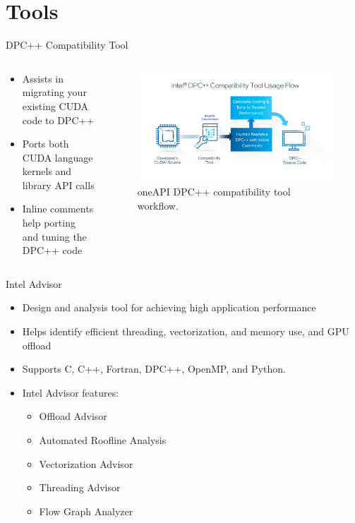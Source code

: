 \documentclass[aspectratio=169]{beamer}
\begin{document}
\section{Tools}

\begin{frame}{DPC++ Compatibility Tool}
\begin{columns}
\begin{column}{0.5\textwidth}
\begin{itemize}
  \item Assists in migrating your existing CUDA code to DPC++
  \item Ports both CUDA language kernels and library API calls
  \item Inline comments help porting and tuning the DPC++ code
\end{itemize}
\end{column}
\begin{column}{0.5\textwidth}
\begin{figure}
  \includegraphics[width=\linewidth]{figures/diagram-oneapi-dpc-compat-tool-16x9.png}
  \caption{oneAPI DPC++ compatibility tool workflow.}
\end{figure}
\end{column}
\end{columns}
\end{frame}

\begin{frame}{Intel Advisor}
\begin{itemize}
  \item Design and analysis tool for achieving high application performance
  \item Helps identify efficient threading, vectorization, and memory use, and GPU offload
  \item Supports C, C++, Fortran, DPC++, OpenMP, and Python.
  \item Intel Advisor features:
  \begin{itemize}
    \item Offload Advisor
    \item Automated Roofline Analysis
    \item Vectorization Advisor
    \item Threading Advisor
    \item Flow Graph Analyzer
  \end{itemize}
\end{itemize}
\end{frame}
\end{document}
